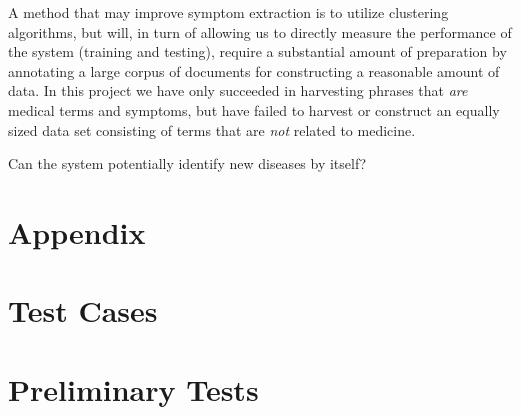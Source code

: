 \documentclass[10pt,letterpaper,final]{article}
\begin{document}
A method that may improve symptom extraction is to utilize clustering
algorithms, but will, in turn of allowing us to directly measure the
performance of the system (training and testing), require a substantial
amount of preparation by annotating a large corpus of documents for
constructing a reasonable amount of data. In this project we have only
succeeded in harvesting phrases that \textit{are} medical terms and
symptoms, but have failed to harvest or construct an equally sized data
set consisting of terms that are \textit{not} related to medicine.

Can the system potentially identify new diseases by itself?

\renewcommand\bibname{References}



\appendix
\section{Appendix}
\label{app:orphanet}

\section{Test Cases}

\section{Preliminary Tests}
\label{app:preliminary_results}

\newpage
\end{document}
